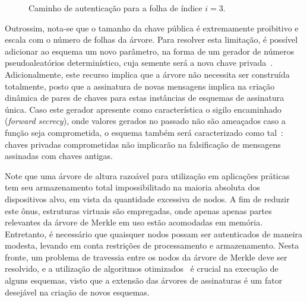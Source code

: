 \documentclass[12pt,notitlepage]{report}
\newcommand{\pk}{\mathcal{P}_k}
\begin{document}
\begin{figure}
    \centering
    \caption{Caminho de autenticação para a folha de índice $i = 3$.}
    \label{fig:9}
\end{figure}

Outrossim, nota-se que o tamanho da chave pública é extremamente proibitivo e escala com o número de folhas da árvore. Para resolver esta limitação, é possível adicionar ao esquema um novo parâmetro, na forma de um gerador de números pseudoaleatórios determinístico, cuja semente será a nova chave privada~\cite[6.4.2.3]{Goldreich:2004:FCV:975541}. Adicionalmente, este recurso implica que a árvore não necessita ser construída totalmente, posto que a assinatura de novas mensagens implica na criação dinâmica de pares de chaves para estas instâncias de esquemas de assinatura única. Caso este gerador apresente como característica o sigilo encaminhado (\emph{forward secrecy}), onde valores gerados no passado não são ameaçados caso a função seja comprometida, o esquema também será caracterizado como tal~\cite{Bernstein:2008:PQC:1522375}: chaves privadas comprometidas não implicarão na falsificação de mensagens assinadas com chaves antigas.

Note que uma árvore de altura razoável para utilização em aplicações práticas tem seu armazenamento total impossibilitado na maioria absoluta dos dispositivos alvo, em vista da quantidade excessiva de nodos. A fim de reduzir este ônus, estruturas virtuais são empregadas, onde apenas apenas partes relevantes da árvore de Merkle em uso estão acomodadas em memória. Entretanto, é necessário que quaisquer nodos possam ser autenticados de maneira modesta, levando em conta restrições de processamento e armazenamento. Nesta fronte, um problema de travessia entre os nodos da árvore de Merkle deve ser resolvido, e a utilização de algoritmos otimizados~\cite{Buchmann:2008:MTT:1473109.1473114} é crucial na execução de alguns esquemas, visto que a extensão das árvores de assinaturas é um fator desejável na criação de novos esquemas.
\end{document}
